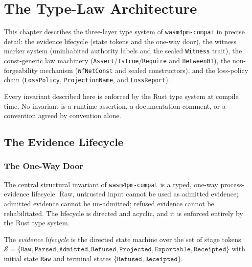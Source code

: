 \chapter{The Type-Law Architecture}
\label{ch:architecture}

This chapter describes the three-layer type system of \texttt{wasm4pm-compat}
in precise detail: the evidence lifecycle (state tokens and the one-way door),
the witness marker system (uninhabited authority labels and the sealed
\texttt{Witness} trait), the const-generic law machinery
(\texttt{Assert}/\texttt{IsTrue}/\texttt{Require} and \texttt{Between01}), the
non-forgeability mechanism (\texttt{WfNetConst} and sealed constructors), and
the loss-policy chain (\texttt{LossPolicy}, \texttt{ProjectionName}, and
\texttt{LossReport}).

Every invariant described here is enforced by the Rust type system at compile
time. No invariant is a runtime assertion, a documentation comment, or a
convention agreed by convention alone.

\section{The Evidence Lifecycle}
\label{sec:arch-lifecycle}

\subsection{The One-Way Door}

The central structural invariant of \texttt{wasm4pm-compat} is a typed,
one-way process-evidence lifecycle. Raw, untrusted input cannot be used as
admitted evidence; admitted evidence cannot be un-admitted; refused evidence
cannot be rehabilitated. The lifecycle is directed and acyclic, and it is
enforced entirely by the Rust type system.

\begin{definition}
  \label{def:lifecycle}
  The \emph{evidence lifecycle} is the directed state machine over the set of
  stage tokens
  $\mathcal{S} = \{\texttt{Raw}, \texttt{Parsed}, \texttt{Admitted},
  \texttt{Refused}, \texttt{Projected}, \texttt{Exportable}, \texttt{Receipted}\}$
  with initial state \texttt{Raw} and terminal states
  $\{\texttt{Refused}, \texttt{Receipted}\}$.
\end{definition}

